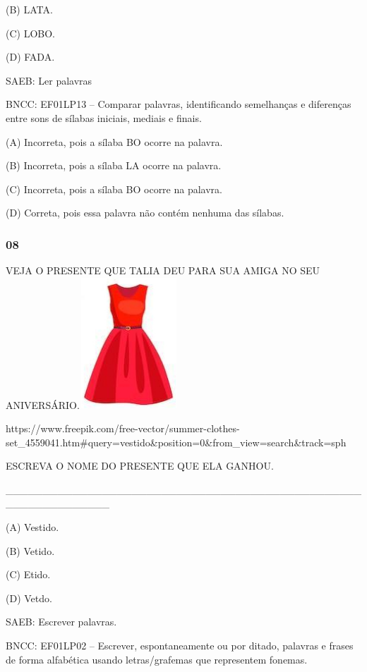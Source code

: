 (B) LATA.

(C) LOBO.

(D) FADA.

SAEB: Ler palavras

BNCC: EF01LP13 -- Comparar palavras, identificando semelhanças e
diferenças entre sons de sílabas iniciais, mediais e finais.

(A) Incorreta, pois a sílaba BO ocorre na palavra.

(B) Incorreta, pois a sílaba LA ocorre na palavra.

(C) Incorreta, pois a sílaba BO ocorre na palavra.

(D) Correta, pois essa palavra não contém nenhuma das sílabas.\protect\hypertarget{_heading=h.7lb9brf4wytg}{}{}

\subsubsection{08 }\label{section-64}

VEJA O PRESENTE QUE TALIA DEU PARA SUA AMIGA NO SEU
ANIVERSÁRIO.\includegraphics[width=1.45972in,height=1.93403in]{media/image232.jpg}

https://www.freepik.com/free-vector/summer-clothes-set\_4559041.htm\#query=vestido\&position=0\&from\_view=search\&track=sph

ESCREVA O NOME DO PRESENTE QUE ELA GANHOU.

\_\_\_\_\_\_\_\_\_\_\_\_\_\_\_\_\_\_\_\_\_\_\_\_\_\_\_\_\_\_\_\_\_\_\_\_\_\_\_\_\_\_\_\_\_\_\_\_\_\_\_\_\_\_\_\_\_\_\_\_\_\_

(A) Vestido.

(B) Vetido.

(C) Etido.

(D) Vetdo.

SAEB: Escrever palavras.

BNCC: EF01LP02 -- Escrever, espontaneamente ou por ditado, palavras e frases de
forma alfabética usando letras/grafemas que representem fonemas.

